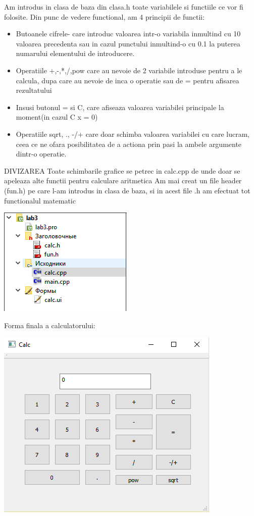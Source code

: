 Am introdus in clasa de baza din clasa.h toate variabilele si functiile ce vor fi folosite.
Din punc de vedere functional, am 4 principii de functii:

	\begin{itemize}
		\item Butoanele cifrele- care introduc valoarea intr-o variabila inmultind cu 10 valoarea precedenta sau in cazul punctului inmultind-o cu 0.1 la puterea numarului elementului de introducere.
	\item Operatiile +,-,*,/,pow care au nevoie de 2 variabile introduse pentru a le calcula, dupa care au nevoie de inca o operatie sau de = pentru afisarea rezultatului
	\item Insusi butonul = si C, care afiseaza valoarea variabilei principale la moment(in cazul C x = 0)
\item 	Operatiile sqrt, ., -/+ care doar schimba valoarea variabilei cu care lucram, ceea ce ne ofara posibilitatea de a actiona prin pasi la ambele argumente dintr-o operatie.
\end{itemize}	
	DIVIZAREA
Toate schimbarile grafice se petrec in calc.cpp de unde doar se apeleaza alte functii pentru calculare aritmetica
Am mai creat un file header (fun.h) pe care l-am introdus in clasa de baza, si in acest file .h am efectuat tot functionalul matematic
\begin{center}
\includegraphics[width=0.7\linewidth]{divizarea}
\end{center}
Forma finala a calculatorului:
\begin{center}
\includegraphics[width=0.7\linewidth]{3calc}
\end{center}

